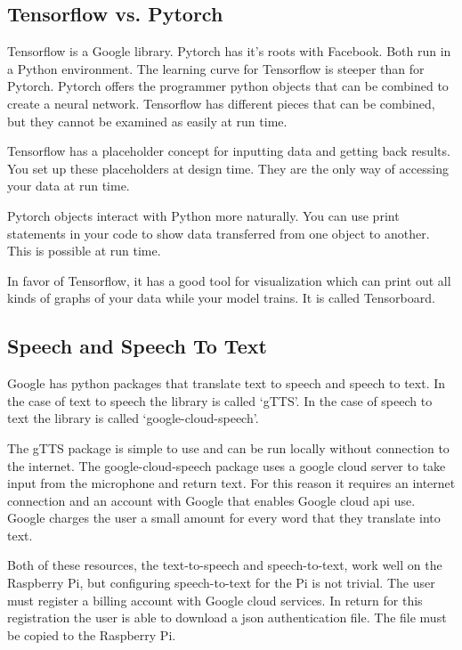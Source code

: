 \subsection{Tensorflow vs. Pytorch}

Tensorflow is a Google library. Pytorch has it's roots with Facebook. Both run in a Python environment. The learning curve for Tensorflow is steeper than for Pytorch. Pytorch offers the programmer python objects that can be combined to create a neural network. Tensorflow has different pieces that can be combined, but they cannot be examined as easily at run time.

Tensorflow has a placeholder concept for inputting data and getting back results. You set up these placeholders at design time. They are the only way of accessing your data at run time.

Pytorch objects interact with Python more naturally. You can use print statements in your code to show data transferred from one object to another. This is possible at run time.

In favor of Tensorflow, it has a good tool for visualization which can print out all kinds of graphs of your data while your model trains. It is called Tensorboard.

\subsection{Speech and Speech To Text}

Google has python packages that translate text to speech and speech to text. In the case of text to speech the library is called `\ac{gTTS}'. In the case of speech to text the library is called `google-cloud-speech'. 

The gTTS package is simple to use and can be run locally without connection to the internet. The google-cloud-speech package uses a google cloud server to take input from the microphone and return text. For this reason it requires an internet connection and an account with Google that enables Google cloud api use. Google charges the user a small amount for every word that they translate into text. 

Both of these resources, the text-to-speech and speech-to-text, work well on the Raspberry Pi, but configuring speech-to-text for the Pi is not trivial. The user must register a billing account with Google cloud services. In return for this registration the user is able to download a json authentication file. The file must be copied to the Raspberry Pi. 

